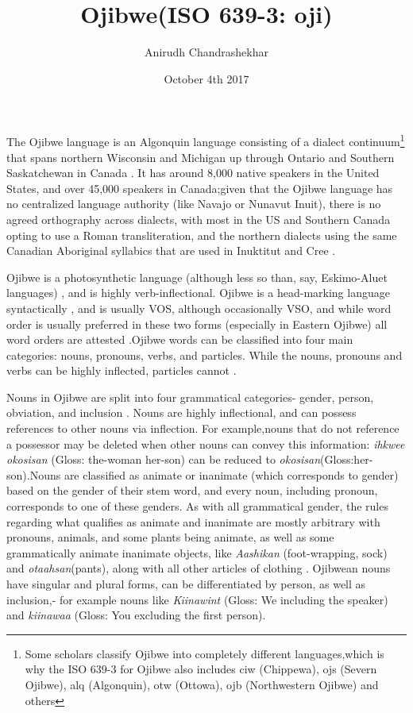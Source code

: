 \documentclass{report}
\title{Ojibwe(ISO 639-3: oji)}
\author{Anirudh Chandrashekhar}
\date{October 4th 2017}
\begin{document}
\maketitle
The Ojibwe language is an Algonquin language consisting of a dialect continuum\footnote{Some scholars classify Ojibwe into completely different languages,which is why the ISO 639-3 for Ojibwe also includes ciw (Chippewa), ojs (Severn Ojibwe), alq (Algonquin), otw (Ottowa), ojb (Northwestern Ojibwe) and others} that spans northern Wisconsin and Michigan up through Ontario and Southern Saskatchewan in Canada \citep{bloomfield2016eastern}. It has around 8,000 native speakers in the United States, and over 45,000 speakers in Canada;given that the Ojibwe language has no centralized language authority (like Navajo or Nunavut Inuit), there is no agreed orthography across dialects, with most in the US and Southern Canada opting to use a Roman transliteration, and the northern dialects using the same Canadian Aboriginal syllabics that are used in Inuktitut and Cree \citep{bloomfield2016eastern}.

Ojibwe is a photosynthetic language (although less so than, say, Eskimo-Aluet languages) , and is highly verb-inflectional. Ojibwe is a head-marking language syntactically , and is usually VOS, although occasionally VSO, and while word order is usually preferred in these two forms (especially in Eastern Ojibwe) all word orders are attested \citep{bloomfield2016eastern}.Ojibwe words can be classified into four main categories: nouns, pronouns, verbs, and particles. While the nouns, pronouns and verbs can be highly inflected, particles cannot \citep{wiscgrammar}.

Nouns in Ojibwe are split into four grammatical categories- gender, person, obviation, and inclusion \citep{todd1970grammar}. Nouns are highly inflectional, and can possess references to other nouns via inflection. For example,nouns that do not reference a possessor may be deleted when other nouns can convey this information: \emph{ihkwee okosisan} (Gloss: the-woman  her-son) can be reduced to \emph{okosisan}(Gloss:her-son).Nouns are classified as animate or inanimate (which corresponds to gender) based on the gender of their stem word, and every noun, including pronoun, corresponds to one of these genders. As with all grammatical gender, the rules regarding what qualifies as animate and inanimate are mostly arbitrary with pronouns, animals, and some plants being animate, as well as some grammatically animate inanimate objects, like \emph{Aashikan} (foot-wrapping, sock) and \emph{otaahsan}(pants), along with all other articles of clothing \citep{bloomfield2016eastern}. Ojibwean nouns have singular and plural forms, can be differentiated by person, as well as inclusion,- for example nouns like \emph{Kiinawint} (Gloss: We including the speaker) and \emph{kiinawaa} (Gloss: You excluding the first person).
\end{document}
